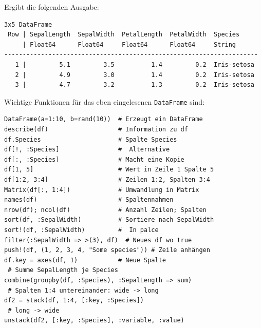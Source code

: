 \documentclass[10pt,twocolumn]{scrartcl}
\begin{document}
Ergibt die folgenden Ausgabe:
\begin{lstlisting}[basicstyle=\scriptsize]
3x5 DataFrame
 Row | SepalLength  SepalWidth  PetalLength  PetalWidth  Species
     | Float64      Float64     Float64      Float64     String
---------------------------------------------------------------------
   1 |         5.1         3.5          1.4         0.2  Iris-setosa
   2 |         4.9         3.0          1.4         0.2  Iris-setosa
   3 |         4.7         3.2          1.3         0.2  Iris-setosa
\end{lstlisting}

Wichtige Funktionen für das eben eingelesenen \lstinline|DataFrame| sind:

\begin{lstlisting}
DataFrame(a=1:10, b=rand(10))  # Erzeugt ein DataFrame
describe(df)                   # Information zu df
df.Species                     # Spalte Species
df[!, :Species]                #  Alternative
df[:, :Species]                # Macht eine Kopie
df[1, 5]                       # Wert in Zeile 1 Spalte 5
df[1:2, 3:4]                   # Zeilen 1:2, Spalten 3:4
Matrix(df[:, 1:4])             # Umwandlung in Matrix
names(df)                      # Spaltennahmen
nrow(df); ncol(df)             # Anzahl Zeilen; Spalten
sort(df, :SepalWidth)          # Sortiere nach SepalWidth
sort!(df, :SepalWidth)         #  In palce
filter(:SepalWidth => >(3), df)  # Neues df wo true
push!(df, (1, 2, 3, 4, "Some species")) # Zeile anhängen
df.key = axes(df, 1)           # Neue Spalte
 # Summe SepalLength je Species
combine(groupby(df, :Species), :SepalLength => sum)
 # Spalten 1:4 untereinander: wide -> long
df2 = stack(df, 1:4, [:key, :Species])
 # long -> wide
unstack(df2, [:key, :Species], :variable, :value)
\end{lstlisting}


\end{document}
